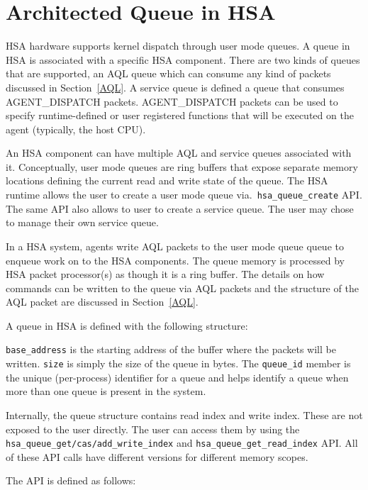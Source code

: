 \hypertarget{architected\_queue}{} \section{Architected Queue in
H\-S\-A} \label{architected_queue}

H\-S\-A hardware supports kernel dispatch through user mode queues.
A queue in HSA is associated with a specific HSA component. There
are two kinds of queues that are supported, an AQL queue which can
consume any kind of packets discussed in Section~\ref{AQL}. A
service queue is defined a queue that consumes AGENT\_DISPATCH
packets. AGENT\_DISPATCH packets can be used to specify
runtime-defined or user registered functions that will be executed
on the agent (typically, the host CPU).

An HSA component can have multiple AQL and service queues associated
with it.  Conceptually, user mode queues are ring buffers that
expose separate memory locations defining the current read and write
state of the queue. The HSA runtime allows the user to create a user
mode queue via.\ \texttt{hsa\_queue\_create} API. The same API also
allows to user to create a service queue. The user may chose to
manage their own service queue.

In a HSA system, agents write AQL packets to the user mode queue
queue to enqueue work on to the HSA components. The queue memory is
processed by HSA packet processor(s) as though it is a ring buffer.
The details on how commands can be written to the queue via AQL
packets and the structure of the AQL packet are discussed in
Section~\ref{AQL}.


A queue in HSA is defined with the following structure:



\texttt{base\_address} is the starting address of the buffer where
the packets will be written.  \texttt{size} is simply the size of
the queue in bytes.  The \texttt{queue\-\_\-id} member is the unique
(per-process) identifier for a queue and helps identify a queue when
more than one queue is present in the system.

Internally, the queue structure contains read index and write index.
These are not exposed to the user directly. The user can access them
by using the \texttt{hsa\_queue\_get/cas/add\_write\_index} and
\texttt{hsa\_queue\_get\_read\_index} API. All of these API calls
have different versions for different memory scopes.

The API is defined as follows:

